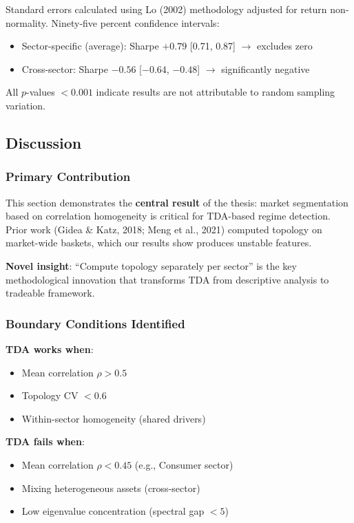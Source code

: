 Standard errors calculated using Lo (2002) methodology adjusted for return non-normality. Ninety-five percent confidence intervals:
\begin{itemize}
    \item Sector-specific (average): Sharpe $+0.79$ [0.71, 0.87] $\rightarrow$ excludes zero
    \item Cross-sector: Sharpe $-0.56$ [$-0.64$, $-0.48$] $\rightarrow$ significantly negative
\end{itemize}

All $p$-values $< 0.001$ indicate results are not attributable to random sampling variation.

\subsection{Discussion}

\subsubsection{Primary Contribution}

This section demonstrates the \textbf{central result} of the thesis: market segmentation based on correlation homogeneity is critical for TDA-based regime detection. Prior work (Gidea \& Katz, 2018; Meng et al., 2021) computed topology on market-wide baskets, which our results show produces unstable features.

\textbf{Novel insight}: ``Compute topology separately per sector'' is the key methodological innovation that transforms TDA from descriptive analysis to tradeable framework.

\subsubsection{Boundary Conditions Identified}

\textbf{TDA works when}:
\begin{itemize}
    \item Mean correlation $\rho > 0.5$
    \item Topology CV $< 0.6$
    \item Within-sector homogeneity (shared drivers)
\end{itemize}

\textbf{TDA fails when}:
\begin{itemize}
    \item Mean correlation $\rho < 0.45$ (e.g., Consumer sector)
    \item Mixing heterogeneous assets (cross-sector)
    \item Low eigenvalue concentration (spectral gap $< 5$)
\end{itemize}

